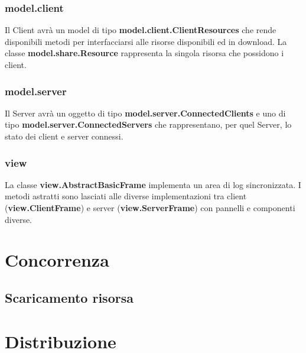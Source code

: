 \documentclass[
10pt, %
a4paper, %
oneside, %
BCOR5mm, %
]{scrartcl}
\begin{document}
 		\subsubsection{model.client}
 			
 			Il Client avrà un model di tipo \textbf{model.client.ClientResources} che rende disponibili metodi per interfacciarsi alle risorse disponibili ed in download.
 			La classe \textbf{model.share.Resource} rappresenta la singola risorsa che possidono i client.
 			
 		\subsubsection{model.server}

 			Il Server avrà un oggetto di tipo \textbf{model.server.ConnectedClients} e uno di tipo \textbf{model.server.ConnectedServers} che rappresentano, per quel Server, lo stato dei client e server connessi.

 		\subsubsection{view}

 			La classe \textbf{view.AbstractBasicFrame} implementa un area di log sincronizzata. I metodi astratti sono lasciati alle diverse implementazioni tra client (\textbf{view.ClientFrame}) e server (\textbf{view.ServerFrame}) con pannelli e componenti diverse.


\section{Concorrenza}

	\subsection{Scaricamento risorsa}


\section{Distribuzione}

	\subsection{}

	\subsection{}
\end{document}
